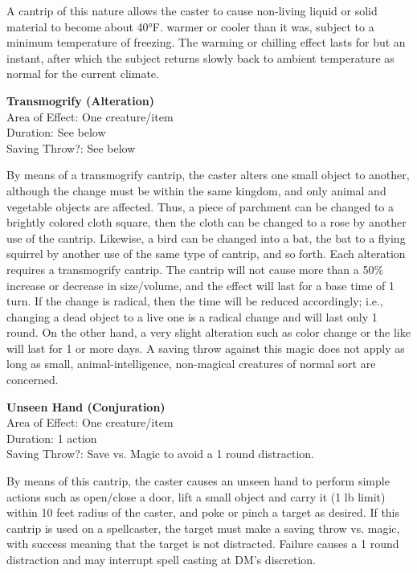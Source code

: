 \documentclass[letterpaper,sansserif,tightsqueeze]{rpg-module}
\begin{document}
A cantrip of this nature allows the caster to cause non-living liquid or solid material to become about 40°F. warmer or cooler than it was, subject to a minimum temperature of freezing. The warming or chilling effect lasts for but an instant, after which the subject returns slowly back to ambient temperature as normal for the current climate.
	
\textbf{Transmogrify (Alteration)}\\
Area of Effect: One creature/item\\
Duration: See below\\
Saving Throw?: See below
	
By means of a transmogrify cantrip, the caster alters one small object to another, although the change must be within the same kingdom, and only animal and vegetable objects are affected. Thus, a piece of parchment can be changed to a brightly colored cloth square, then the cloth can be changed to a rose by another use of the cantrip. Likewise, a bird can be changed into a bat, the bat to a flying squirrel by another use of the same type of cantrip, and so forth. Each alteration requires a transmogrify cantrip. The cantrip will not cause more than a 50\% increase or decrease in size/volume, and the effect will last for a base time of 1 turn. If the change is radical, then the time will be reduced accordingly; i.e., changing a dead object to a live one is a radical change and will last only 1 round. On the other hand, a very slight alteration such as color change or the like will last for 1 or more days. A saving throw against this magic does not apply as long as small, animal-intelligence, non-magical creatures of normal sort are concerned.
	
\textbf{Unseen Hand (Conjuration)}\\
Area of Effect: One creature/item\\
Duration: 1 action\\
Saving Throw?: Save vs. Magic to avoid a 1 round distraction.
	
By means of this cantrip, the caster causes an unseen hand to perform simple actions such as open/close a door, lift a small object and carry it (1 lb limit) within 10 feet radius of the caster, and poke or pinch a target as desired.
If this cantrip is used on a spellcaster, the target must make a saving throw vs. magic, with success meaning that the target is not distracted. Failure causes a 1 round distraction and may interrupt spell casting at DM’s discretion.\\
\end{document}
